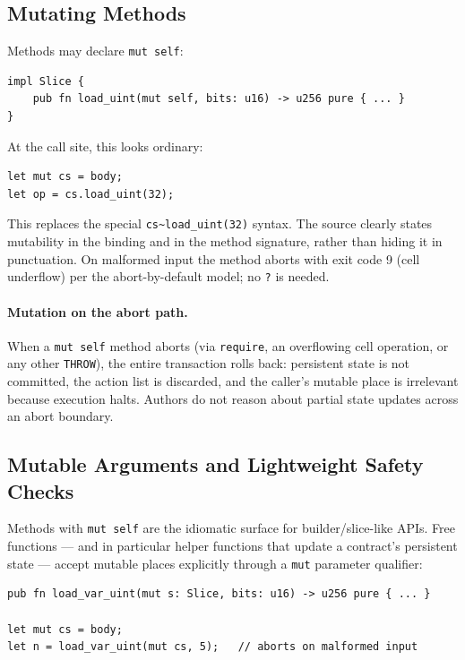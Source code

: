 \documentclass[12pt,oneside]{article}
\begin{document}
\subsection{Mutating Methods}
Methods may declare \verb|mut self|:

\begin{verbatim}
impl Slice {
    pub fn load_uint(mut self, bits: u16) -> u256 pure { ... }
}
\end{verbatim}

At the call site, this looks ordinary:

\begin{verbatim}
let mut cs = body;
let op = cs.load_uint(32);
\end{verbatim}

This replaces the special \verb|cs~load_uint(32)| syntax. The source
clearly states mutability in the binding and in the method signature,
rather than hiding it in punctuation. On malformed input the method
aborts with exit code 9 (cell underflow) per the abort-by-default
model; no \verb|?| is needed.

\paragraph{Mutation on the abort path.}
When a \verb|mut self| method aborts (via \verb|require|, an
overflowing cell operation, or any other \verb|THROW|), the entire
transaction rolls back: persistent state is not committed, the action
list is discarded, and the caller's mutable place is irrelevant because
execution halts. Authors do not reason about partial state updates
across an abort boundary.

\subsection{Mutable Arguments and Lightweight Safety Checks}
\label{sec:mut-args}
Methods with \verb|mut self| are the idiomatic surface for
builder/slice-like APIs. Free functions --- and in particular helper
functions that update a contract's persistent state --- accept mutable
places explicitly through a \verb|mut| parameter qualifier:

\begin{verbatim}
pub fn load_var_uint(mut s: Slice, bits: u16) -> u256 pure { ... }

let mut cs = body;
let n = load_var_uint(mut cs, 5);   // aborts on malformed input
\end{verbatim}
\end{document}
